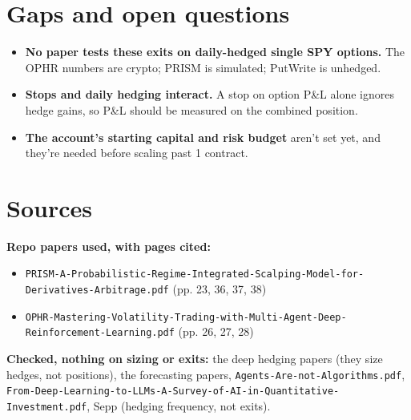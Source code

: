 \documentclass{article}
\begin{document}
\section{Gaps and open questions}

\begin{itemize}

\item \textbf{No paper tests these exits on daily-hedged single SPY options.} The OPHR numbers are crypto; PRISM is simulated; PutWrite is unhedged.

\item \textbf{Stops and daily hedging interact.} A stop on option P\&L alone ignores hedge gains, so P\&L should be measured on the combined position.

\item \textbf{The account's starting capital and risk budget} aren't set yet, and they're needed before scaling past 1 contract.

\end{itemize}

\section{Sources}

\textbf{Repo papers used, with pages cited:}

\begin{itemize}

\item \texttt{PRISM-\allowbreak{}A-\allowbreak{}Probabilistic-\allowbreak{}Regime-\allowbreak{}Integrated-\allowbreak{}Scalping-\allowbreak{}Model-\allowbreak{}for-\allowbreak{}Derivatives-\allowbreak{}Arbitrage.\allowbreak{}pdf} (pp. 23, 36, 37, 38)

\item \texttt{OPHR-\allowbreak{}Mastering-\allowbreak{}Volatility-\allowbreak{}Trading-\allowbreak{}with-\allowbreak{}Multi-\allowbreak{}Agent-\allowbreak{}Deep-\allowbreak{}Reinforcement-\allowbreak{}Learning.\allowbreak{}pdf} (pp. 26, 27, 28)

\end{itemize}

\textbf{Checked, nothing on sizing or exits:} the deep hedging papers (they size hedges, not positions), the forecasting papers, \texttt{Agents-\allowbreak{}Are-\allowbreak{}not-\allowbreak{}Algorithms.\allowbreak{}pdf}, \texttt{From-\allowbreak{}Deep-\allowbreak{}Learning-\allowbreak{}to-\allowbreak{}LLMs-\allowbreak{}A-\allowbreak{}Survey-\allowbreak{}of-\allowbreak{}AI-\allowbreak{}in-\allowbreak{}Quantitative-\allowbreak{}Investment.\allowbreak{}pdf}, Sepp (hedging frequency, not exits).
\end{document}
